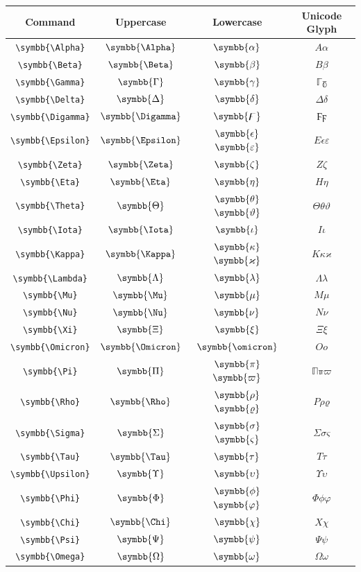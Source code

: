 \documentclass[12pt,a4paper]{article}
\begin{document}
\begin{longtable}{|c|c|c|c|}
\hline
\textbf{Command} & \textbf{Uppercase} & \textbf{Lowercase} & \textbf{Unicode Glyph} \\
\hline
\verb|\symbb{\Alpha}| & $\symbb{\Alpha}$ & $\symbb{\alpha}$ & $ Α 𝛼 $ \\
\verb|\symbb{\Beta}| & $\symbb{\Beta}$ & $\symbb{\beta}$ & $ Β 𝛽 $ \\
\verb|\symbb{\Gamma}| & $\symbb{\Gamma}$ & $\symbb{\gamma}$ & $ ℾ ℽ $ \\
\verb|\symbb{\Delta}| & $\symbb{\Delta}$ & $\symbb{\delta}$ & $ Δ 𝛿 $ \\
\verb|\symbb{\Digamma}| & $\symbb{\Digamma}$ & $\symbb{\digamma}$ & $ Ϝ ϝ $ \\
\verb|\symbb{\Epsilon}| & $\symbb{\Epsilon}$ & $\symbb{\epsilon}$ $\symbb{\varepsilon}$ & $ Ε 𝜖 𝜀 $ \\
\verb|\symbb{\Zeta}| & $\symbb{\Zeta}$ & $\symbb{\zeta}$ & $ Ζ 𝜁 $ \\
\verb|\symbb{\Eta}| & $\symbb{\Eta}$ & $\symbb{\eta}$ & $ Η 𝜂 $ \\
\verb|\symbb{\Theta}| & $\symbb{\Theta}$ & $\symbb{\theta}$ $\symbb{\vartheta}$ & $ Θ 𝜃 𝜗 $ \\
\verb|\symbb{\Iota}| & $\symbb{\Iota}$ & $\symbb{\iota}$ & $ Ι 𝜄 $ \\
\verb|\symbb{\Kappa}| & $\symbb{\Kappa}$ & $\symbb{\kappa}$ $\symbb{\varkappa}$ & $ Κ 𝜅 𝜘 $ \\
\verb|\symbb{\Lambda}| & $\symbb{\Lambda}$ & $\symbb{\lambda}$ & $ Λ 𝜆 $ \\
\verb|\symbb{\Mu}| & $\symbb{\Mu}$ & $\symbb{\mu}$ & $ Μ 𝜇 $ \\
\verb|\symbb{\Nu}| & $\symbb{\Nu}$ & $\symbb{\nu}$ & $ Ν 𝜈 $ \\
\verb|\symbb{\Xi}| & $\symbb{\Xi}$ & $\symbb{\xi}$ & $ Ξ 𝜉 $ \\
\verb|\symbb{\Omicron}| & $\symbb{\Omicron}$ & $\symbb{\omicron}$ & $ Ο 𝜊 $ \\
\verb|\symbb{\Pi}| & $\symbb{\Pi}$ & $\symbb{\pi}$ $\symbb{\varpi}$ & $ ℿ  ℼ 𝜛 $ \\
\verb|\symbb{\Rho}| & $\symbb{\Rho}$ & $\symbb{\rho}$ $\symbb{\varrho}$ & $ Ρ 𝜌 𝜚 $ \\
\verb|\symbb{\Sigma}| & $\symbb{\Sigma}$ & $\symbb{\sigma}$ $\symbb{\varsigma}$ & $ Σ 𝜎 𝜍 $ \\
\verb|\symbb{\Tau}| & $\symbb{\Tau}$ & $\symbb{\tau}$ & $ Τ 𝜏 $ \\
\verb|\symbb{\Upsilon}| & $\symbb{\Upsilon}$ & $\symbb{\upsilon}$ & $ Υ 𝜐 $ \\
\verb|\symbb{\Phi}| & $\symbb{\Phi}$ & $\symbb{\phi}$ $\symbb{\varphi}$ & $ Φ 𝜙 𝜑 $ \\
\verb|\symbb{\Chi}| & $\symbb{\Chi}$ & $\symbb{\chi}$ & $ Χ 𝜒 $ \\
\verb|\symbb{\Psi}| & $\symbb{\Psi}$ & $\symbb{\psi}$ & $ Ψ 𝜓 $ \\
\verb|\symbb{\Omega}| & $\symbb{\Omega}$ & $\symbb{\omega}$ & $ Ω 𝜔 $ \\
\hline
\end{longtable}
\end{document}
